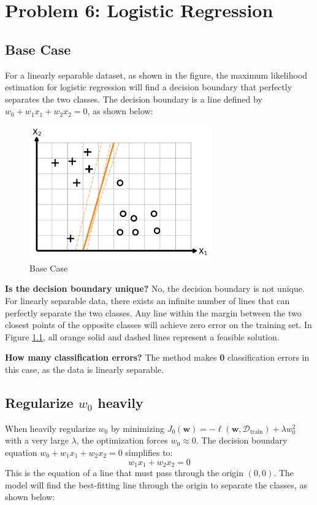 \documentclass[11pt, a4paper, oneside]{memoir}
\begin{document}
\chapter{Problem 6: Logistic Regression}
\section{Base Case}
For a linearly separable dataset, as shown in the figure,
the maximum likelihood estimation for logistic regression will find a decision boundary that perfectly separates the two classes.
The decision boundary is a line defined by $w_0 + w_1x_1 + w_2x_2 = 0$, as shown below:

\begin{figure}[H]
    \centering
    \includegraphics[width=0.7\textwidth]{code/result/problem6_1.pdf}
    \caption{Base Case}
    \label{fig:problem6_1}
\end{figure}

\textbf{Is the decision boundary unique?} No, the decision boundary is not unique. For linearly separable data,
there exists an infinite number of lines that can perfectly separate the two classes.
Any line within the margin between the two closest points of the opposite classes will achieve zero error on the training set.
In Figure \ref{fig:problem6_1}, all orange solid and dashed lines represent a feasible solution.

\textbf{How many classification errors?} The method makes \textbf{0} classification errors in this case, as the data is linearly separable.

\section[Regularize w0 heavily]{Regularize $w_0$ heavily}
When heavily regularize $w_0$ by minimizing $J_0(\mathbf{w}) = -\ell(\mathbf{w}, \mathcal{D}_{\text{train}}) + \lambda w_0^2$ with a very large $\lambda$,
the optimization forces $w_0 \approx 0$. The decision boundary equation $w_0 + w_1x_1 + w_2x_2 = 0$ simplifies to:
\[ w_1x_1 + w_2x_2 = 0 \]
This is the equation of a line that must pass through the origin $(0,0)$.
The model will find the best-fitting line through the origin to separate the classes, as shown below:
\end{document}
